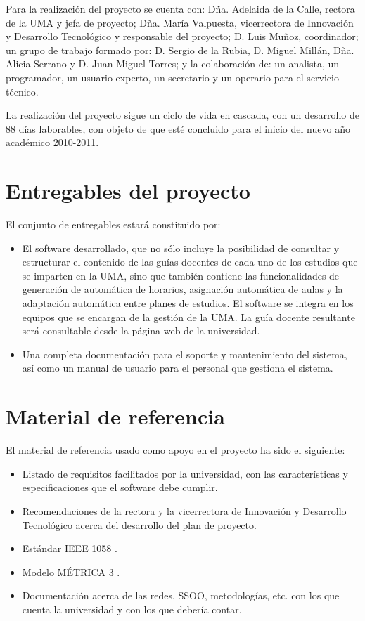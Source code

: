 \documentclass[11pt,a4paper,spanish,twoside]{report}
\begin{document}
Para la realización del proyecto se cuenta con: Dña. Adelaida de la Calle, 
rectora de la UMA y jefa de proyecto; Dña. María Valpuesta, vicerrectora de 
Innovación y Desarrollo Tecnológico y responsable del proyecto; D. Luis 
Muñoz, coordinador; un grupo de trabajo formado por: D. Sergio de la Rubia, 
D. Miguel Millán, Dña. Alicia Serrano y D. Juan Miguel Torres; y la 
colaboración de: un analista, un programador, un usuario experto, un 
secretario y un operario para el servicio técnico.

La realización del proyecto sigue un ciclo de vida en cascada, con un 
desarrollo de 88 días laborables, con objeto de que esté concluido para el 
inicio del nuevo año académico 2010-2011.

\section{Entregables del proyecto}
El conjunto de entregables estará constituido por:
\begin{itemize}
\item El software desarrollado, que no sólo incluye la posibilidad de
  consultar y estructurar el contenido de las guías docentes de cada uno de
  los estudios que se imparten en la UMA, sino que también contiene las
  funcionalidades de generación de automática de horarios, asignación
  automática de aulas y la adaptación automática entre planes de estudios. El
  software se integra en los equipos que se encargan de la gestión de la
  UMA. La guía docente resultante será consultable desde la página web de la
  universidad.
\item Una completa documentación para el soporte y mantenimiento del sistema,
  así como un manual de usuario para el personal que gestiona el sistema. 
\end{itemize}

\section{Material de referencia}
El material de referencia usado como apoyo en el proyecto ha sido el siguiente:
\begin{itemize}
\item Listado de requisitos facilitados por la universidad, con las 
  características y especificaciones que el software debe cumplir.
\item Recomendaciones de la rectora y la vicerrectora de Innovación y 
  Desarrollo Tecnológico acerca del desarrollo del plan de proyecto.
\item Estándar IEEE 1058 \cite{ieee}.
\item Modelo MÉTRICA 3 \cite{met}.
\item Documentación acerca de las redes, SSOO, metodologías, etc. con los que 
  cuenta la universidad y con los que debería contar.
\end{itemize}
\end{document}
